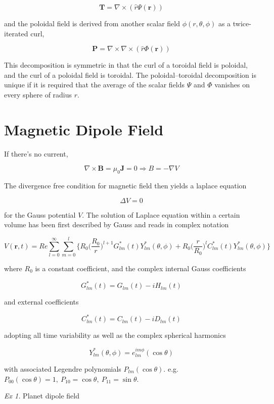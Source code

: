 \documentclass[
  notoc %
]{tufte-book}
\begin{document}
\[
\mathbf{T}=\nabla\times(\widehat{r}\Psi(\mathbf{r}))
\]

and the poloidal field is derived from another scalar field
\(\phi(r,\theta,\phi)\) as a twice-iterated curl,

\[
\mathbf{P}=\nabla\times\nabla\times(\widehat{r}\Phi(\mathbf{r}))
\]

This decomposition is symmetric in that the curl of a toroidal field is
poloidal, and the curl of a poloidal field is toroidal. The
poloidal--toroidal decomposition is unique if it is required that the
average of the scalar fields \(\Psi\) and \(\Phi\) vanishes on every
sphere of radius \(r\).

\hypertarget{magnetic-dipole-field}{%
\section{Magnetic Dipole Field}\label{magnetic-dipole-field}}

If there's no current,

\[
\nabla\times\mathbf{B}=\mu_0 \mathbf{J} = 0 \Rightarrow B=-\nabla V
\]

The divergence free condition for magnetic field then yields a laplace
equation

\[
\Delta V = 0
\]

for the Gauss potential \(V\). The solution of Laplace equation within a
certain volume has been first described by Gauss and reads in complex
notation

\[
V(\mathbf{r},t) = Re \sum_{l=0}^{\infty}\sum_{m=0}^{l} \Big\{ R_0 \big( \frac{R_0}{r}\big)^{l+1} G_{lm}^\ast(t)Y_{lm}^\ast(\theta,\phi) + R_0\big( \frac{r}{R_0} \big)^{l} C_{lm}^\ast(t)Y_{lm}^\ast(\theta,\phi) \Big\}
\]

where \(R_0\) is a constant coefficient, and the complex internal Gauss
coefficients

\[
G_{lm}^\ast(t) = G_{lm}(t) - i H_{lm}(t)
\]

and external coefficients

\[
C_{lm}^\ast(t) = C_{lm}(t) - iD_{lm}(t)
\]

adopting all time variability as well as the complex spherical harmonics

\[
Y_{lm}^\ast(\theta,\phi) = e^{im\phi}_{lm}(\cos{\theta})
\]

with associated Legendre polynomials \(P_{lm}(\cos{\theta})\).
e.g.~\(P_{00}(\cos\theta) = 1,\ P_{10} = \cos\theta,\ P_{11} = \sin\theta\).

\emph{Ex 1.} Planet dipole field
\end{document}
